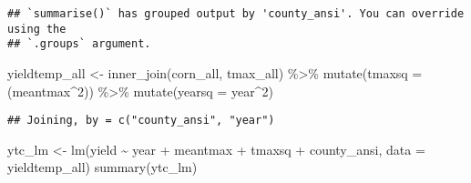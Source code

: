 \documentclass[
]{book}
\newenvironment{Shaded}{\begin{snugshade}}{\end{snugshade}}
\newcommand{\AttributeTok}[1]{\textcolor[rgb]{0.77,0.63,0.00}{#1}}
\newcommand{\DecValTok}[1]{\textcolor[rgb]{0.00,0.00,0.81}{#1}}
\newcommand{\FunctionTok}[1]{\textcolor[rgb]{0.00,0.00,0.00}{#1}}
\newcommand{\NormalTok}[1]{#1}
\newcommand{\OtherTok}[1]{\textcolor[rgb]{0.56,0.35,0.01}{#1}}
\newcommand{\SpecialCharTok}[1]{\textcolor[rgb]{0.00,0.00,0.00}{#1}}
\begin{document}
\begin{verbatim}
## `summarise()` has grouped output by 'county_ansi'. You can override using the
## `.groups` argument.
\end{verbatim}

\begin{Shaded}
\begin{Highlighting}[]
\NormalTok{yieldtemp\_all }\OtherTok{\textless{}{-}} \FunctionTok{inner\_join}\NormalTok{(corn\_all, tmax\_all) }\SpecialCharTok{\%\textgreater{}\%}
  \FunctionTok{mutate}\NormalTok{(}\AttributeTok{tmaxsq =}\NormalTok{ (meantmax}\SpecialCharTok{\^{}}\DecValTok{2}\NormalTok{)) }\SpecialCharTok{\%\textgreater{}\%}
  \FunctionTok{mutate}\NormalTok{(}\AttributeTok{yearsq =}\NormalTok{ year}\SpecialCharTok{\^{}}\DecValTok{2}\NormalTok{)}
\end{Highlighting}
\end{Shaded}

\begin{verbatim}
## Joining, by = c("county_ansi", "year")
\end{verbatim}

\begin{Shaded}
\begin{Highlighting}[]
\NormalTok{ytc\_lm }\OtherTok{\textless{}{-}} \FunctionTok{lm}\NormalTok{(yield }\SpecialCharTok{\textasciitilde{}}\NormalTok{ year }\SpecialCharTok{+}\NormalTok{ meantmax }\SpecialCharTok{+}\NormalTok{ tmaxsq }\SpecialCharTok{+}\NormalTok{ county\_ansi, }\AttributeTok{data =}\NormalTok{ yieldtemp\_all)}
\FunctionTok{summary}\NormalTok{(ytc\_lm)}
\end{Highlighting}
\end{Shaded}
\end{document}
